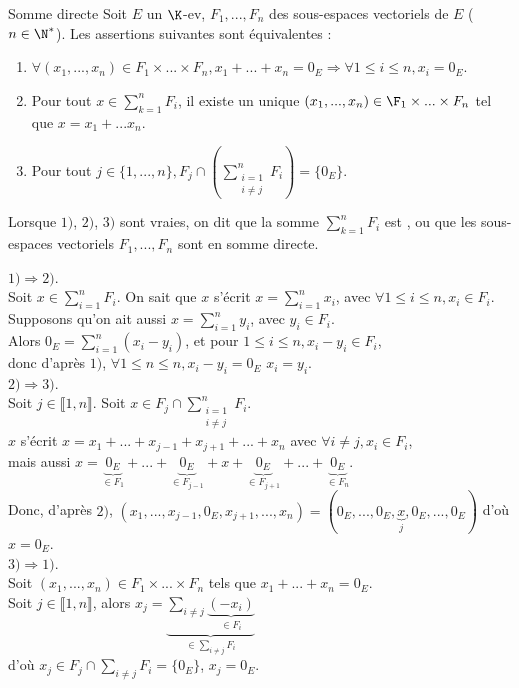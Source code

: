 \documentclass[12pt, a4paper]{report}
\begin{document}
\begin{definition}{Somme directe}{}
Soit $E$ un $\K$-ev, $F_1,...,F_n$ des sous-espaces vectoriels de $E$ ($n \in \N^*$). Les assertions suivantes sont équivalentes :
\begin{enumerate}
	\item $\forall (x_1,...,x_n) \in F_1 \times ... \times F_n, x_1+...+x_n = 0_E \Longrightarrow \forall 1 \le i \le n, x_i = 0_E$.
	\item Pour tout $x \in \displaystyle{\sum_{k=1}^n F_i}$, il existe un unique $(x_1,...,x_n) \in \F_1 \times ... \times F_n$ tel que $x = x_1+...x_n$.
	\item Pour tout $j \in \{1,...,n\}, F_j \cap \left(\displaystyle{\sum_{\substack{i=1 \\ i \ne j}}^n F_i}\right) = \{0_E \}$.
\end{enumerate}
Lorsque $1)$, $2)$, $3)$ sont vraies, on dit que la somme $\displaystyle{\sum_{k=1}^nF_i}$ est , ou que les sous-espaces vectoriels $F_1,...,F_n$ sont en somme directe.
\end{definition}

\begin{demo}{}
$1) \Longrightarrow 2)$. \\
Soit $x \in \displaystyle{\sum_{i=1}^n F_i}$. On sait que $x$ s'écrit $x=\displaystyle{\sum_{i=1}^nx_i}$, avec $\forall 1 \le i \le n, x_i \in F_i$. \\
Supposons qu'on ait aussi $x = \displaystyle{\sum_{i=1}^n y_i}$, avec $y_i \in F_i$. \\
Alors $0_E = \displaystyle{\sum_{i=1}^n (x_i-y_i)}$, et pour $1 \le i \le n, x_i - y_i \in F_i$, \\
donc d'après $1)$, $\forall 1 \le n \le n, x_i-y_i = 0_E$ \ie $x_i = y_i$. \\

$2) \Longrightarrow 3)$. \\
Soit $j \in \llbracket 1,n \rrbracket$. Soit $x \in F_j \cap \displaystyle{\sum_{\substack{i=1 \\ i \ne j}}^n F_i}$. \\
$x$ s'écrit $x = x_1+...+x_{j-1}+x_{j+1} + ... + x_n$ avec $\forall i \ne j, x_i \in F_i$,\\
mais aussi $x = \underbrace{0_E}_{\in F_1} + ... + \underbrace{0_E}_{\in F_{j-1}} + x + \underbrace{0_E}_{\in F_{j+1}} + ... + \underbrace{0_E}_{\in F_n}$. \\
Donc, d'après $2)$, $(x_1,...,x_{j-1},0_E,x_{j+1},...,x_n) = (0_E,...,0_E,\underbrace{x}_{j},0_E,...,0_E)$ d'où $x = 0_E$. \\

$3) \Longrightarrow 1)$. \\
Soit $(x_1,...,x_n) \in F_1 \times ... \times F_n$ tels que $x_1+...+x_n = 0_E$. \\
Soit $j \in \llbracket 1,n \rrbracket$, alors $x_j = \underbrace{\displaystyle{\sum_{i \ne j} \underbrace{(-x_i)}_{\in F_i}}}_{\in \displaystyle{\sum_{i \ne j} F_i}}$ \\
d'où $x_j \in F_j \cap \displaystyle{\sum_{i \ne j} F_i} = \{0_E \}$, \ie $x_j = 0_E$.

\end{demo}
\end{document}
